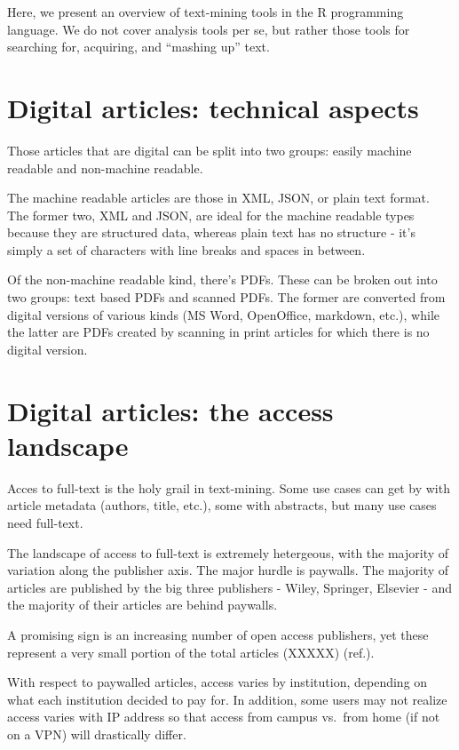 \documentclass[author-year, review, 11pt]{components/elsarticle} %
\begin{document}
Here, we present an overview of text-mining tools in the R programming
language. We do not cover analysis tools per se, but rather those tools
for searching for, acquiring, and ``mashing up'' text.

\hypertarget{digital-articles-technical-aspects}{%
\section{Digital articles: technical
aspects}\label{digital-articles-technical-aspects}}

Those articles that are digital can be split into two groups: easily
machine readable and non-machine readable.

The machine readable articles are those in XML, JSON, or plain text
format. The former two, XML and JSON, are ideal for the machine readable
types because they are structured data, whereas plain text has no
structure - it's simply a set of characters with line breaks and spaces
in between.

Of the non-machine readable kind, there's PDFs. These can be broken out
into two groups: text based PDFs and scanned PDFs. The former are
converted from digital versions of various kinds (MS Word, OpenOffice,
markdown, etc.), while the latter are PDFs created by scanning in print
articles for which there is no digital version.

\hypertarget{digital-articles-the-access-landscape}{%
\section{Digital articles: the access
landscape}\label{digital-articles-the-access-landscape}}

Acces to full-text is the holy grail in text-mining. Some use cases can
get by with article metadata (authors, title, etc.), some with
abstracts, but many use cases need full-text.

The landscape of access to full-text is extremely hetergeous, with the
majority of variation along the publisher axis. The major hurdle is
paywalls. The majority of articles are published by the big three
publishers - Wiley, Springer, Elsevier - and the majority of their
articles are behind paywalls.

A promising sign is an increasing number of open access publishers, yet
these represent a very small portion of the total articles (XXXXX)
(ref.).

With respect to paywalled articles, access varies by institution,
depending on what each institution decided to pay for. In addition, some
users may not realize access varies with IP address so that access from
campus vs.~from home (if not on a VPN) will drastically differ.
\end{document}
